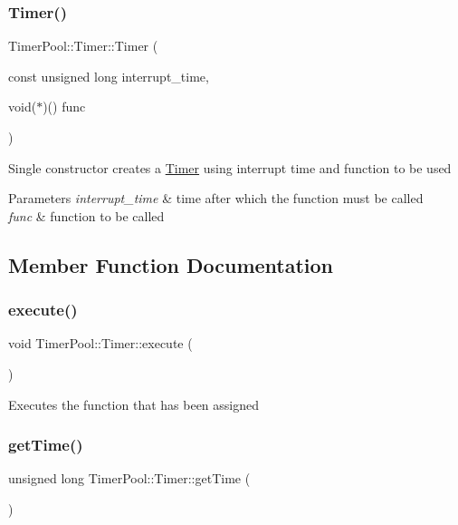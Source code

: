 \subsubsection{\texorpdfstring{Timer()}{Timer()}}
{\footnotesize\ttfamily Timer\+Pool\+::\+Timer\+::\+Timer (\begin{DoxyParamCaption}\item[{const unsigned long}]{interrupt\+\_\+time,  }\item[{void($\ast$)()}]{func }\end{DoxyParamCaption})}

Single constructor creates a \hyperlink{struct_timer_pool_1_1_timer}{Timer} using interrupt time and function to be used 
\begin{DoxyParams}{Parameters}
{\em interrupt\+\_\+time} & time after which the function must be called \\
\hline
{\em func} & function to be called \\
\hline
\end{DoxyParams}


\subsection{Member Function Documentation}
\mbox{\label{struct_timer_pool_1_1_timer_a797fa28dcf35d00e9081ecb368323343}} 
\subsubsection{\texorpdfstring{execute()}{execute()}}
{\footnotesize\ttfamily void Timer\+Pool\+::\+Timer\+::execute (\begin{DoxyParamCaption}{ }\end{DoxyParamCaption})}

Executes the function that has been assigned \mbox{\label{struct_timer_pool_1_1_timer_a05ef787e6585b0ef7123bb804223706d}} 
\subsubsection{\texorpdfstring{get\+Time()}{getTime()}}
{\footnotesize\ttfamily unsigned long Timer\+Pool\+::\+Timer\+::get\+Time (\begin{DoxyParamCaption}{ }\end{DoxyParamCaption})}

